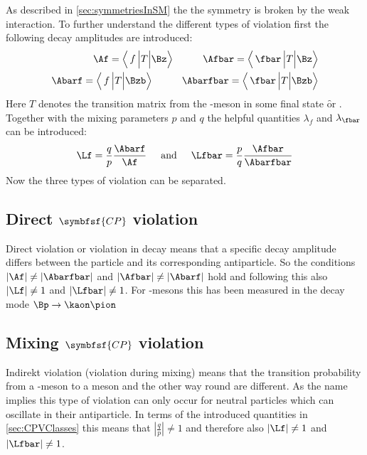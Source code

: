As described in \cref{sec:symmetriesInSM} the the \CP symmetry is broken by the weak interaction. To further understand
the different types of \CP violation first the following decay amplitudes are introduced:
\begin{equation}
\begin{split}
\Af = \left<\,f\,\Big|T\Big|\Bz\right>\hspace{1cm}\Afbar = \left<\,\fbar\,\Big|T\Big|\Bz\right>\\
\Abarf = \left<\,f\,\Big|T\Big|\Bzb\right>\hspace{1cm}\Abarfbar = \left<\,\fbar\,\Big|T\Big|\Bzb\right>
\end{split}
\end{equation}
Here $T$ denotes the transition matrix from the \B-meson in some final state \f or \fbar. Together with the
mixing parameters $p$ and $q$ the helpful quantities $\lambda_f$ and $\lambda_{\fbar}$ can be introduced:
\begin{equation}
\Lf=\frac{q}{p}\frac{\Abarf}{\Af}\hspace{0.5cm}\text{and}
\hspace{0.5cm}\Lfbar=\frac{p}{q}\frac{\Afbar}{\Abarfbar}
\end{equation}
Now the three types of \CP violation can be separated.

\subsection[head={Direct \CP violation},tocentry={Direct \CP violation}]{Direct $\symbfsf{C{}P}$ violation}
\label{sec:DirectCPV}

Direct \CP violation or \CP violation in decay means that a specific decay amplitude differs between the particle and  its
corresponding antiparticle. So the conditions $\left|\Af\right|\neq\left|\Abarfbar\right|$ and
$\left|\Afbar\right|\neq\left|\Abarf\right|$ hold and following this also $\left|\Lf\right|\neq1$ and $\left|\Lfbar\right|\neq1$.
For \B-mesons this has been measured in the decay mode $\Bp\to\kaon\pion$

\subsection[head={Mixing \CP violation},tocentry={Mixing \CP violation}]{Mixing $\symbfsf{C{}P}$ violation}
\label{sec:MixingCPV}

Indirekt \CP violation (\CP violation during mixing) means that the transition probability from a \Bz-meson to a \Bzb meson
and the other way round are different. As the name implies this type of \CP violation can only occur for neutral particles
which can oscillate in their antiparticle. In terms of the introduced quantities in \cref{sec:CPVClasses} this means that
$\left|\frac{q}{p}\right|\neq1$ and therefore also $\left|\Lf\right|\neq1$ and $\left|\Lfbar\right|\neq1$.

